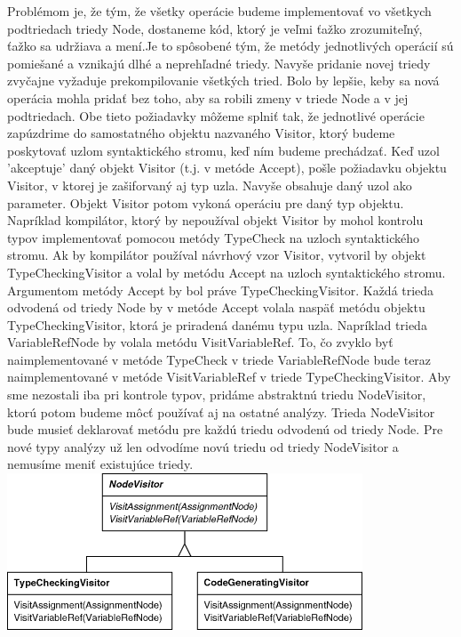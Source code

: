 		Problémom je, že tým, že všetky operácie budeme implementovať vo všetkych podtriedach triedy Node, dostaneme kód, ktorý je veľmi ťažko zrozumiteľný, ťažko sa udržiava a mení.Je to spôsobené tým, že metódy jednotlivých operácií sú pomiešané a vznikajú dlhé a neprehľadné triedy. Navyše pridanie novej triedy zvyčajne vyžaduje prekompilovanie všetkých tried. Bolo by lepšie, keby sa nová operácia mohla pridať bez toho, aby sa robili zmeny v triede Node a v jej podtriedach. Obe tieto požiadavky môžeme splniť tak, že jednotlivé operácie zapúzdrime do samostatného objektu nazvaného Visitor, ktorý budeme poskytovať uzlom syntaktického stromu, keď ním budeme prechádzať. Keď uzol 'akceptuje' daný objekt Visitor (t.j. v metóde Accept), pošle požiadavku objektu Visitor, v ktorej je zašiforvaný aj typ uzla. Navyše obsahuje daný uzol ako parameter. Objekt Visitor potom vykoná operáciu pre daný typ objektu. Napríklad kompilátor, ktorý by nepoužíval objekt Visitor by mohol kontrolu typov implementovať pomocou metódy TypeCheck na uzloch syntaktického stromu. Ak by kompilátor používal návrhový vzor Visitor, vytvoril by objekt TypeCheckingVisitor a volal by metódu Accept na uzloch syntaktického stromu. Argumentom metódy Accept by bol práve TypeCheckingVisitor. Každá trieda odvodená od triedy Node by v metóde Accept volala naspäť metódu objektu TypeCheckingVisitor, ktorá je priradená danému typu uzla. Napríklad trieda VariableRefNode by volala metódu VisitVariableRef. To, čo zvyklo byť naimplementované v metóde TypeCheck v triede VariableRefNode bude teraz naimplementované v metóde VisitVariableRef v triede TypeCheckingVisitor. Aby sme nezostali iba pri kontrole typov, pridáme abstraktnú triedu NodeVisitor, ktorú potom budeme môcť používať aj na ostatné analýzy. Trieda NodeVisitor bude musieť deklarovať metódu pre každú triedu odvodenú od triedy Node. Pre nové typy analýzy už len odvodíme novú triedu od triedy NodeVisitor a nemusíme meniť existujúce triedy.\\


		\includegraphics[width=.7\textwidth]{images/visitor2}






